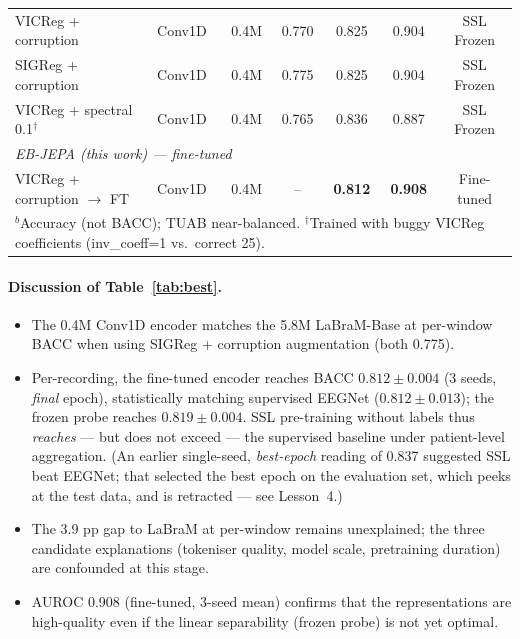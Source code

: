 \documentclass[11pt,a4paper]{article}
\begin{document}
\begin{table}[htbp]
{\begin{tabular}{llccccc}
VICReg + corruption & Conv1D & 0.4M & 0.770 & 0.825 & 0.904 & SSL Frozen \\
SIGReg + corruption & Conv1D & 0.4M & 0.775 & 0.825 & 0.904 & SSL Frozen \\
VICReg + spectral 0.1$^{\dagger}$ & Conv1D & 0.4M & 0.765 & 0.836 & 0.887 & SSL Frozen \\
\midrule
\multicolumn{7}{l}{\textit{EB-JEPA (this work) --- fine-tuned}} \\
VICReg + corruption $\to$ FT & Conv1D & 0.4M & -- & \textbf{0.812} & \textbf{0.908} & Fine-tuned \\
\bottomrule
\multicolumn{7}{l}{%
  $^b$Accuracy (not BACC); TUAB near-balanced.
  $^{\dagger}$Trained with buggy VICReg coefficients (inv\_coeff=1 vs.\ correct 25).}
\end{tabular}}
\end{table}

\paragraph{Discussion of Table~\ref{tab:best}.}
\begin{itemize}[noitemsep]
  \item The 0.4M Conv1D encoder matches the 5.8M LaBraM-Base at per-window
        BACC when using SIGReg + corruption augmentation (both 0.775).
  \item Per-recording, the fine-tuned encoder reaches BACC
        $0.812 \pm 0.004$ (3 seeds, \emph{final} epoch), statistically
        matching supervised EEGNet ($0.812 \pm 0.013$); the frozen probe
        reaches $0.819 \pm 0.004$.  SSL pre-training without labels thus
        \emph{reaches} --- but does not exceed --- the supervised baseline
        under patient-level aggregation.  (An earlier single-seed,
        \emph{best-epoch} reading of 0.837 suggested SSL beat EEGNet; that
        selected the best epoch on the evaluation set, which peeks at the
        test data, and is retracted --- see Lesson~4.)
  \item The 3.9 pp gap to LaBraM at per-window remains unexplained; the three
        candidate explanations (tokeniser quality, model scale, pretraining
        duration) are confounded at this stage.
  \item AUROC 0.908 (fine-tuned, 3-seed mean) confirms that the representations are
        high-quality even if the linear separability (frozen probe) is
        not yet optimal.
\end{itemize}
\end{document}
